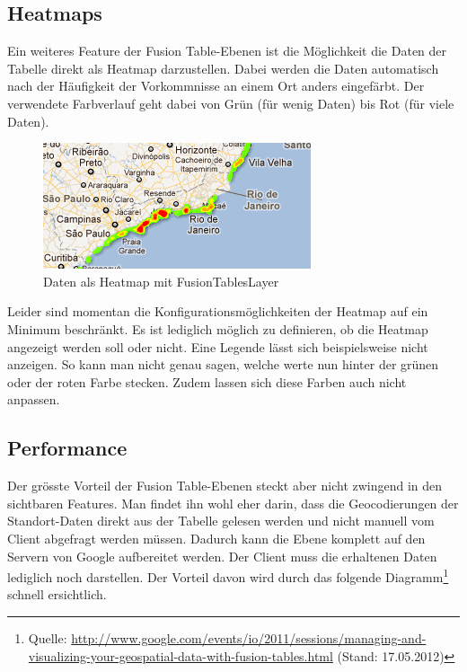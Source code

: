 \subsection{Heatmaps}
Ein weiteres Feature der Fusion Table-Ebenen ist die Möglichkeit die Daten der Tabelle direkt als Heatmap darzustellen. Dabei werden die Daten automatisch nach der Häufigkeit der Vorkommnisse an einem Ort anders eingefärbt. Der verwendete Farbverlauf geht dabei von Grün (für wenig Daten) bis Rot (für viele Daten).

\begin{figure}[!h]
	\centering
	\includegraphics{images/gmap_fusiontableslayer_heatmap.png}
	\caption{Daten als Heatmap mit FusionTablesLayer}
	\label{fusiontableslayer-heatmap}
\end{figure}

Leider sind momentan die Konfigurationsmöglichkeiten der Heatmap auf ein Minimum beschränkt. Es ist lediglich möglich zu definieren, ob die Heatmap angezeigt werden soll oder nicht. Eine Legende lässt sich beispielsweise nicht anzeigen. So kann man nicht genau sagen, welche werte nun hinter der grünen oder der roten Farbe stecken. Zudem lassen sich diese Farben auch nicht anpassen.

\subsection{Performance}
Der grösste Vorteil der Fusion Table-Ebenen steckt aber nicht zwingend in den sichtbaren Features. Man findet ihn wohl eher darin, dass die Geocodierungen der Standort-Daten direkt aus der Tabelle gelesen werden und nicht manuell vom Client abgefragt werden müssen. Dadurch kann die Ebene komplett auf den Servern von Google aufbereitet werden. Der Client muss die erhaltenen Daten lediglich noch darstellen. Der Vorteil davon wird durch das folgende Diagramm\footnote{Quelle: \url{http://www.google.com/events/io/2011/sessions/managing-and-visualizing-your-geospatial-data-with-fusion-tables.html} (Stand: 17.05.2012)} schnell ersichtlich.

